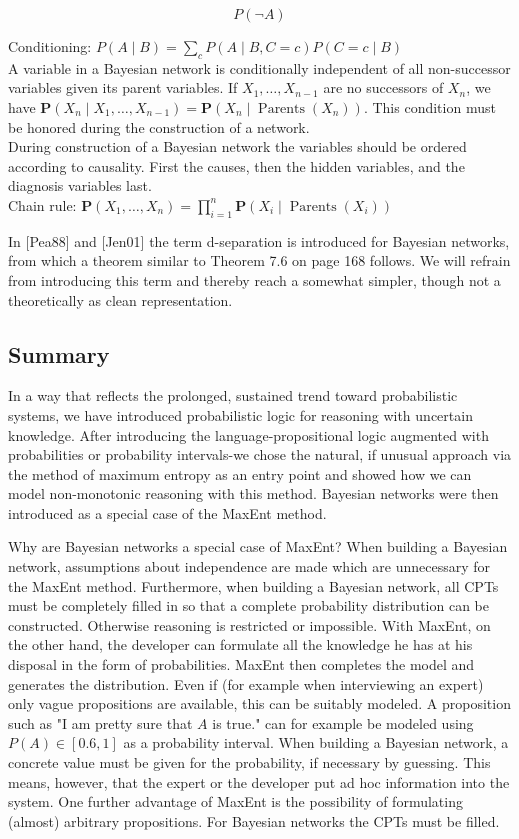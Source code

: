 \documentclass[10pt]{article}
\begin{document}
$$
P(\neg A)
$$

Conditioning: $P(A \mid B)=\sum_{c} P(A \mid B, C=c) P(C=c \mid B)$\\
A variable in a Bayesian network is conditionally independent of all non-successor variables given its parent variables. If $X_{1}, \ldots, X_{n-1}$ are no successors of $X_{n}$, we have $\boldsymbol{P}\left(X_{n} \mid X_{1}, \ldots, X_{n-1}\right)=\boldsymbol{P}\left(X_{n} \mid \operatorname{Parents}\left(X_{n}\right)\right)$. This condition must be honored during the construction of a network.\\
During construction of a Bayesian network the variables should be ordered according to causality. First the causes, then the hidden variables, and the diagnosis variables last.\\
Chain rule: $\boldsymbol{P}\left(X_{1}, \ldots, X_{n}\right)=\prod_{i=1}^{n} \boldsymbol{P}\left(X_{i} \mid \operatorname{Parents}\left(X_{i}\right)\right)$

In [Pea88] and [Jen01] the term d-separation is introduced for Bayesian networks, from which a theorem similar to Theorem 7.6 on page 168 follows. We will refrain from introducing this term and thereby reach a somewhat simpler, though not a theoretically as clean representation.

\subsection*{Summary}
In a way that reflects the prolonged, sustained trend toward probabilistic systems, we have introduced probabilistic logic for reasoning with uncertain knowledge. After introducing the language-propositional logic augmented with probabilities or probability intervals-we chose the natural, if unusual approach via the method of maximum entropy as an entry point and showed how we can model non-monotonic reasoning with this method. Bayesian networks were then introduced as a special case of the MaxEnt method.

Why are Bayesian networks a special case of MaxEnt? When building a Bayesian network, assumptions about independence are made which are unnecessary for the MaxEnt method. Furthermore, when building a Bayesian network, all CPTs must be completely filled in so that a complete probability distribution can be constructed. Otherwise reasoning is restricted or impossible. With MaxEnt, on the other hand, the developer can formulate all the knowledge he has at his disposal in the form of probabilities. MaxEnt then completes the model and generates the distribution. Even if (for example when interviewing an expert) only vague propositions are available, this can be suitably modeled. A proposition such as "I am pretty sure that $A$ is true." can for example be modeled using $P(A) \in[0.6,1]$ as a probability interval. When building a Bayesian network, a concrete value must be given for the probability, if necessary by guessing. This means, however, that the expert or the developer put ad hoc information into the system. One further advantage of MaxEnt is the possibility of formulating (almost) arbitrary propositions. For Bayesian networks the CPTs must be filled.
\end{document}
